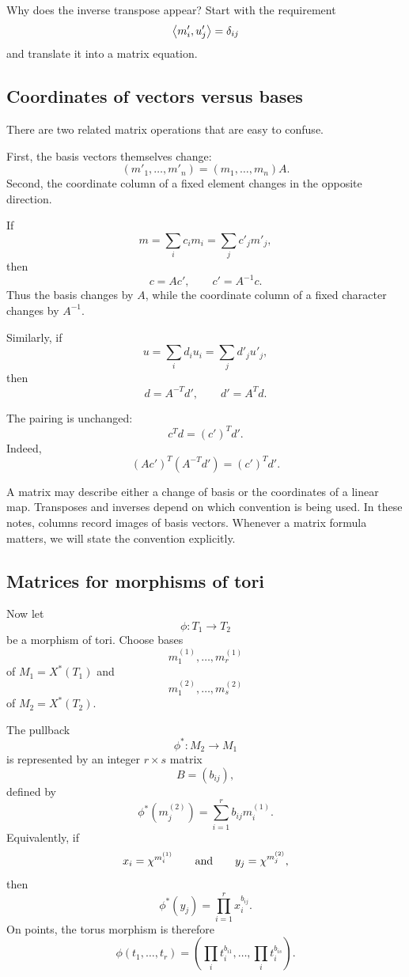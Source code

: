 \begin{pauseandthink}
Why does the inverse transpose appear? Start with the requirement
\[
\left\langle m'_i,u'_j\right\rangle=\delta_{ij}
\]
and translate it into a matrix equation.
\end{pauseandthink}

\subsection{Coordinates of vectors versus bases}

There are two related matrix operations that are easy to confuse.

First, the basis vectors themselves change:
\[
(m'_1,\ldots,m'_n)
=
(m_1,\ldots,m_n)A.
\]
Second, the coordinate column of a fixed element changes in the
opposite direction.

If
\[
m=\sum_i c_i m_i=\sum_j c'_j m'_j,
\]
then
\[
c=Ac',
\qquad
c'=A^{-1}c.
\]
Thus the basis changes by \(A\), while the coordinate column of a fixed
character changes by \(A^{-1}\).

Similarly, if
\[
u=\sum_i d_i u_i=\sum_j d'_j u'_j,
\]
then
\[
d=A^{-T}d',
\qquad
d'=A^Td.
\]

The pairing is unchanged:
\[
c^Td
=
(c')^Td'.
\]
Indeed,
\[
(Ac')^T(A^{-T}d')
=
(c')^Td'.
\]

\begin{warningbox}
A matrix may describe either a change of basis or the coordinates of a
linear map. Transposes and inverses depend on which convention is
being used. In these notes, columns record images of basis vectors.
Whenever a matrix formula matters, we will state the convention
explicitly.
\end{warningbox}

\subsection{Matrices for morphisms of tori}

Now let
\[
\phi:T_1\longrightarrow T_2
\]
be a morphism of tori. Choose bases
\[
m_1^{(1)},\ldots,m_r^{(1)}
\]
of \(M_1=X^*(T_1)\) and
\[
m_1^{(2)},\ldots,m_s^{(2)}
\]
of \(M_2=X^*(T_2)\).

The pullback
\[
\phi^*:M_2\longrightarrow M_1
\]
is represented by an integer \(r\times s\) matrix
\[
B=(b_{ij}),
\]
defined by
\[
\phi^*(m_j^{(2)})
=
\sum_{i=1}^r b_{ij}m_i^{(1)}.
\]
Equivalently, if
\[
x_i=\chi^{m_i^{(1)}}
\qquad\text{and}\qquad
y_j=\chi^{m_j^{(2)}},
\]
then
\[
\phi^*(y_j)
=
\prod_{i=1}^r x_i^{b_{ij}}.
\]
On points, the torus morphism is therefore
\[
\phi(t_1,\ldots,t_r)
=
\left(
\prod_i t_i^{b_{i1}},
\ldots,
\prod_i t_i^{b_{is}}
\right).
\]

